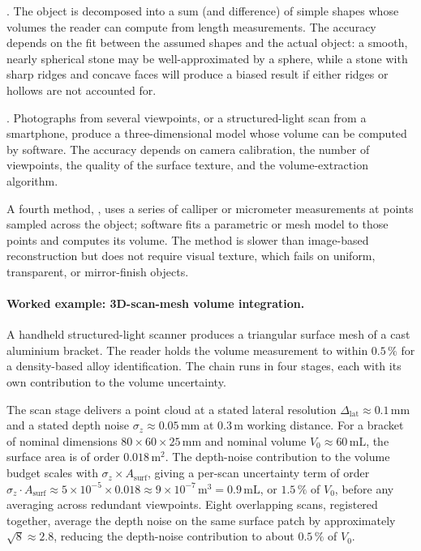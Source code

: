. The object is decomposed into a
sum (and difference) of simple shapes whose volumes the reader can
compute from length measurements. The accuracy depends on the fit
between the assumed shapes and the actual object: a smooth, nearly
spherical stone may be well-approximated by a sphere, while a stone
with sharp ridges and concave faces will produce a biased result if
either ridges or hollows are not accounted for.

. Photographs from several
viewpoints, or a structured-light scan from a smartphone, produce a
three-dimensional model whose volume can be computed by software.
The accuracy depends on camera calibration, the number of viewpoints,
the quality of the surface texture, and the volume-extraction
algorithm.

A fourth method, ,
uses a series of calliper or micrometer measurements at points
sampled across the object; software fits a parametric or mesh model
to those points and computes its volume. The method is slower than
image-based reconstruction but does not require visual texture, which
fails on uniform, transparent, or mirror-finish objects.

\paragraph{Worked example: 3D-scan-mesh volume integration.}
A handheld structured-light scanner produces a triangular surface
mesh of a cast aluminium bracket. The reader holds the volume
measurement to within $0.5\,\%$ for a density-based alloy
identification. The chain runs in four stages, each with its own
contribution to the volume uncertainty.

The scan stage delivers a point cloud at a stated lateral resolution
$\Delta_{\mathrm{lat}} \approx 0.1 \,\si{\milli\meter}$ and a stated
depth noise $\sigma_{z} \approx 0.05 \,\si{\milli\meter}$ at
$0.3 \,\si{\meter}$ working distance. For a bracket of nominal
dimensions $80 \times 60 \times 25 \,\si{\milli\meter}$ and nominal
volume $V_{0} \approx 60 \,\si{\milli\liter}$, the surface area is
of order $0.018 \,\si{\meter\squared}$. The depth-noise contribution
to the volume budget scales with $\sigma_{z} \times A_{\mathrm{surf}}$,
giving a per-scan uncertainty term of order $\sigma_{z} \cdot
A_{\mathrm{surf}} \approx 5 \times 10^{-5} \times 0.018 \approx
9 \times 10^{-7} \,\si{\meter\cubed} = 0.9 \,\si{\milli\liter}$,
or $1.5\,\%$ of $V_{0}$, before any averaging across redundant
viewpoints. Eight overlapping scans, registered together, average
the depth noise on the same surface patch by approximately
$\sqrt{8} \approx 2.8$, reducing the depth-noise contribution to
about $0.5\,\%$ of $V_{0}$.

